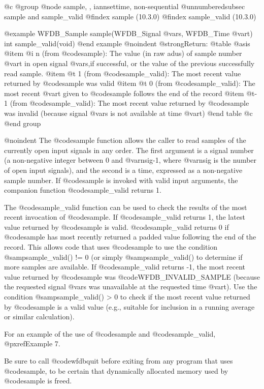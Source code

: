 {{{{{{{{@c @group
@node     sample, , iannsettime, non-sequential
@unnumberedsubsec sample and sample_valid
@findex sample (10.3.0)
@findex sample_valid (10.3.0)

@example
WFDB_Sample sample(WFDB_Signal @var{s}, WFDB_Time @var{t})
int sample_valid(void)
@end example
@noindent
@strong{Return:}
@table @asis
@item @i{ n}
(from @code{sample}): The value (in raw adus) of sample number @var{t}
in open signal @var{s},if successful, or the value of the previous
successfully read sample.
@item @t{ 1}
(from @code{sample_valid}): The most recent value returned by
@code{sample} was valid
@item @t{ 0}
(from @code{sample_valid}): The most recent @var{t} given to @code{sample}
follows the end of the record
@item @t{-1}
(from @code{sample_valid}): The most recent value returned by
@code{sample} was invalid (because signal @var{s} is not available at time
@var{t})
@end table
@c @end group

@noindent
The @code{sample} function allows the caller to read samples of the
currently open input signals in any order.  The first argument is a
signal number (a non-negative integer between 0 and @var{nsig}-1,
where @var{nsig} is the number of open input signals), and the second
is a time, expressed as a non-negative sample number. If @code{sample}
is invoked with valid input arguments, the companion function
@code{sample_valid} returns 1.

The @code{sample_valid} function can be used to check the results of the most
recent invocation of @code{sample}.  If @code{sample_valid} returns 1, the
latest value returned by @code{sample} is valid.  @code{sample_valid} returns 0
if @code{sample} has most recently returned a padded value following the end of
the record.  This allows code that uses @code{sample} to use the condition
@samp{sample_valid() != 0} (or simply @samp{sample_valid()} to determine if
more samples are available.  If @code{sample_valid} returns -1, the most recent
value returned by @code{sample} was @code{WFDB_INVALID_SAMPLE} (because the
requested signal @var{s} was unavailable at the requested time @var{t}).  Use
the condition @samp{sample_valid() > 0} to check if the most recent value
returned by @code{sample} is a valid value (e.g., suitable for inclusion in a
running average or similar calculation).

For an example of the use of @code{sample} and @code{sample_valid},
@pxref{Example 7}.

Be sure to call @code{wfdbquit} before exiting from any program that
uses @code{sample}, to be certain that dynamically allocated memory
used by @code{sample} is freed.

}}}}}}}}
